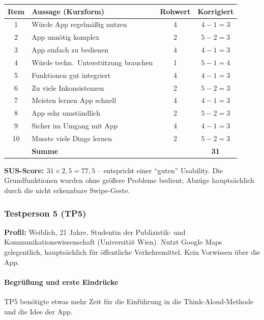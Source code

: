 \documentclass{article}
\begin{document}
\begin{tabular}{@{}clcc@{}}
  \hline
  \textbf{Item} & \textbf{Aussage (Kurzform)} & \textbf{Rohwert} & \textbf{Korrigiert} \\
  \hline
  1  & Würde App regelmäßig nutzen          & 4 & $4-1=3$ \\
  2  & App unnötig komplex                  & 2 & $5-2=3$ \\
  3  & App einfach zu bedienen              & 4 & $4-1=3$ \\
  4  & Würde techn.\ Unterstützung brauchen & 1 & $5-1=4$ \\
  5  & Funktionen gut integriert            & 4 & $4-1=3$ \\
  6  & Zu viele Inkonsistenzen              & 2 & $5-2=3$ \\
  7  & Meisten lernen App schnell           & 4 & $4-1=3$ \\
  8  & App sehr umständlich                 & 2 & $5-2=3$ \\
  9  & Sicher im Umgang mit App             & 4 & $4-1=3$ \\
  10 & Musste viele Dinge lernen            & 2 & $5-2=3$ \\
  \hline
     & \textbf{Summe}                       &   & \textbf{31} \\
  \hline
\end{tabular}

\medskip
\textbf{SUS-Score: $31 \times 2{,}5 = 77{,}5$} –
entspricht einer \enquote{guten} Usability.
Die Grundfunktionen wurden ohne größere Probleme bedient;
Abzüge hauptsächlich durch die nicht erkennbare Swipe-Geste.

\subsubsection*{Testperson 5 (TP5)}

\textbf{Profil:} Weiblich, 21 Jahre, Studentin der Publizistik- und
Kommunikationswissenschaft (Universität Wien).
Nutzt Google Maps gelegentlich, hauptsächlich für öffentliche
Verkehrsmittel. Kein Vorwissen über die App.

\paragraph{Begrüßung und erste Eindrücke}

TP5 benötigte etwas mehr Zeit für die Einführung in die Think-Aloud-Methode und die Idee der App.
\end{document}
